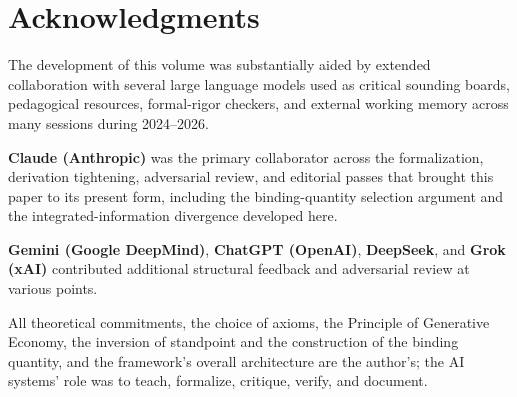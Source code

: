 \documentclass[11pt,oneside]{report}
\theoremstyle{definition}
\theoremstyle{remark}
\begin{document}
\section*{Acknowledgments}

The development of this volume was substantially aided by extended
collaboration with several large language models used as critical
sounding boards, pedagogical resources, formal-rigor checkers, and
external working memory across many sessions during 2024--2026.

\textbf{Claude (Anthropic)} was the primary collaborator across the
formalization, derivation tightening, adversarial review, and editorial
passes that brought this paper to its present form, including the
binding-quantity selection argument and the integrated-information
divergence developed here.

\textbf{Gemini (Google DeepMind)}, \textbf{ChatGPT (OpenAI)},
\textbf{DeepSeek}, and \textbf{Grok (xAI)} contributed additional
structural feedback and adversarial review at various points.

All theoretical commitments, the choice of axioms, the Principle of
Generative Economy, the inversion of standpoint and the construction of
the binding quantity, and the framework's overall architecture are the
author's; the AI systems' role was to teach, formalize, critique, verify,
and document.
\end{document}

